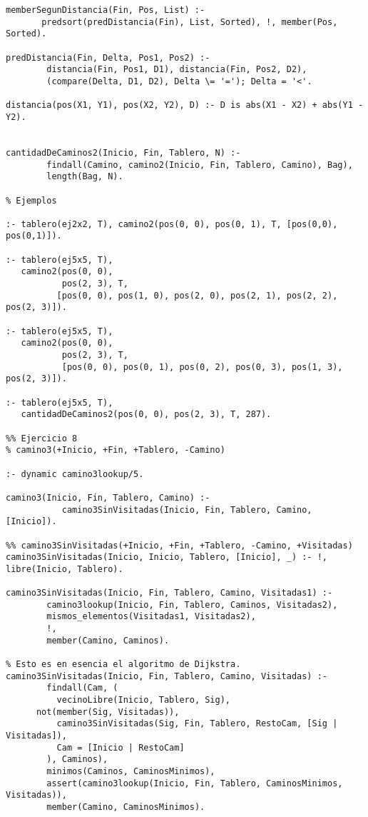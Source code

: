 \begin{verbatim}
memberSegunDistancia(Fin, Pos, List) :- 
       predsort(predDistancia(Fin), List, Sorted), !, member(Pos, Sorted).

predDistancia(Fin, Delta, Pos1, Pos2) :-
        distancia(Fin, Pos1, D1), distancia(Fin, Pos2, D2),
        (compare(Delta, D1, D2), Delta \= '='); Delta = '<'.

distancia(pos(X1, Y1), pos(X2, Y2), D) :- D is abs(X1 - X2) + abs(Y1 - Y2).


cantidadDeCaminos2(Inicio, Fin, Tablero, N) :- 
        findall(Camino, camino2(Inicio, Fin, Tablero, Camino), Bag),
        length(Bag, N).

% Ejemplos

:- tablero(ej2x2, T), camino2(pos(0, 0), pos(0, 1), T, [pos(0,0), pos(0,1)]).

:- tablero(ej5x5, T), 
   camino2(pos(0, 0),
           pos(2, 3), T, 
          [pos(0, 0), pos(1, 0), pos(2, 0), pos(2, 1), pos(2, 2), pos(2, 3)]).

:- tablero(ej5x5, T), 
   camino2(pos(0, 0), 
           pos(2, 3), T, 
           [pos(0, 0), pos(0, 1), pos(0, 2), pos(0, 3), pos(1, 3), pos(2, 3)]).

:- tablero(ej5x5, T), 
   cantidadDeCaminos2(pos(0, 0), pos(2, 3), T, 287).

%% Ejercicio 8
% camino3(+Inicio, +Fin, +Tablero, -Camino)

:- dynamic camino3lookup/5.

camino3(Inicio, Fin, Tablero, Camino) :- 
           camino3SinVisitadas(Inicio, Fin, Tablero, Camino, [Inicio]).

%% camino3SinVisitadas(+Inicio, +Fin, +Tablero, -Camino, +Visitadas) 
camino3SinVisitadas(Inicio, Inicio, Tablero, [Inicio], _) :- !, libre(Inicio, Tablero).

camino3SinVisitadas(Inicio, Fin, Tablero, Camino, Visitadas1) :-
        camino3lookup(Inicio, Fin, Tablero, Caminos, Visitadas2),
        mismos_elementos(Visitadas1, Visitadas2),
        !,
        member(Camino, Caminos).

% Esto es en esencia el algoritmo de Dijkstra.
camino3SinVisitadas(Inicio, Fin, Tablero, Camino, Visitadas) :-
        findall(Cam, (
          vecinoLibre(Inicio, Tablero, Sig),
      not(member(Sig, Visitadas)),
          camino3SinVisitadas(Sig, Fin, Tablero, RestoCam, [Sig | Visitadas]),
          Cam = [Inicio | RestoCam]
        ), Caminos),
        minimos(Caminos, CaminosMinimos),
        assert(camino3lookup(Inicio, Fin, Tablero, CaminosMinimos, Visitadas)),
        member(Camino, CaminosMinimos).


\end{verbatim}
